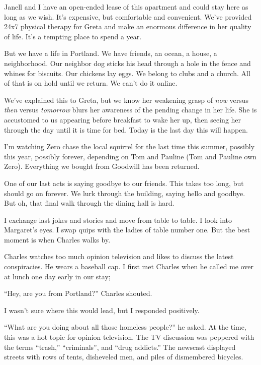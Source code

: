 \documentclass[
  letterpaper,
  DIV=11,
  numbers=noendperiod]{scrreprt}
\begin{document}

Janell and I have an open-ended lease of this apartment and could stay
here as long as we wish. It's expensive, but comfortable and convenient.
We've provided 24x7 physical therapy for Greta and make an enormous
difference in her quality of life. It's a tempting place to spend a
year.

But we have a life in Portland. We have friends, an ocean, a house, a
neighborhood. Our neighbor dog sticks his head through a hole in the
fence and whines for biscuits. Our chickens lay eggs. We belong to clubs
and a church. All of that is on hold until we return. We can't do it
online.

We've explained this to Greta, but we know her weakening grasp of
\emph{now} versus \emph{then} versus \emph{tomorrow} blurs her awareness
of the pending change in her life. She is accustomed to us appearing
before breakfast to wake her up, then seeing her through the day until
it is time for bed. Today is the last day this will happen.

I'm watching Zero chase the local squirrel for the last time this
summer, possibly this year, possibly forever, depending on Tom and
Pauline (Tom and Pauline own Zero). Everything we bought from Goodwill
has been returned.

One of our last acts is saying goodbye to our friends. This takes too
long, but should go on forever. We lurk through the building, saying
hello and goodbye. But oh, that final walk through the dining hall is
hard.

I exchange last jokes and stories and move from table to table. I look
into Margaret's eyes. I swap quips with the ladies of table number one.
But the best moment is when Charles walks by.

Charles watches too much opinion television and likes to discuss the
latest conspiracies. He wears a baseball cap. I first met Charles when
he called me over at lunch one day early in our stay;

``Hey, are you from Portland?'' Charles shouted.

I wasn't sure where this would lead, but I responded positively.

``What are you doing about all those homeless people?'' he asked. At the
time, this was a hot topic for opinion television. The TV discussion was
peppered with the terms ``trash,'' ``criminals'', and ``drug addicts.''
The newscast displayed streets with rows of tents, disheveled men, and
piles of dismembered bicycles.
\end{document}
